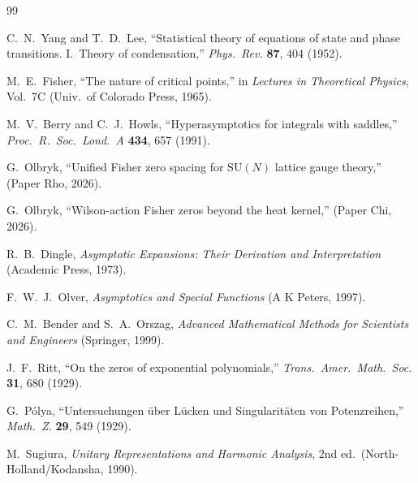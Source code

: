 \documentclass[12pt]{article}
\theoremstyle{definition}
\theoremstyle{remark}
\newcommand{\SU}{\mathrm{SU}}
\begin{document}
\begin{thebibliography}{99}

C.~N.~Yang and T.~D.~Lee,
``Statistical theory of equations of state and phase transitions.
I.~Theory of condensation,''
\emph{Phys.\ Rev.} \textbf{87}, 404 (1952).

M.~E.~Fisher,
``The nature of critical points,''
in \emph{Lectures in Theoretical Physics}, Vol.~7C
(Univ.\ of Colorado Press, 1965).

M.~V.~Berry and C.~J.~Howls,
``Hyperasymptotics for integrals with saddles,''
\emph{Proc.\ R.\ Soc.\ Lond.\ A} \textbf{434}, 657 (1991).

G.~Olbryk,
``Unified Fisher zero spacing for $\SU(N)$ lattice gauge theory,''
(Paper Rho, 2026).

G.~Olbryk,
``Wilson-action Fisher zeros beyond the heat kernel,''
(Paper Chi, 2026).

R.~B.~Dingle,
\emph{Asymptotic Expansions: Their Derivation and Interpretation}
(Academic Press, 1973).

F.~W.~J.~Olver,
\emph{Asymptotics and Special Functions}
(A K Peters, 1997).

C.~M.~Bender and S.~A.~Orszag,
\emph{Advanced Mathematical Methods for Scientists and Engineers}
(Springer, 1999).

J.~F.~Ritt,
``On the zeros of exponential polynomials,''
\emph{Trans.\ Amer.\ Math.\ Soc.} \textbf{31}, 680 (1929).

G.~P\'olya,
``Untersuchungen \"uber L\"ucken und Singularit\"aten von
Potenzreihen,''
\emph{Math.\ Z.} \textbf{29}, 549 (1929).

M.~Sugiura,
\emph{Unitary Representations and Harmonic Analysis},
2nd ed.\ (North-Holland/Kodansha, 1990).

\end{thebibliography}
\end{document}
